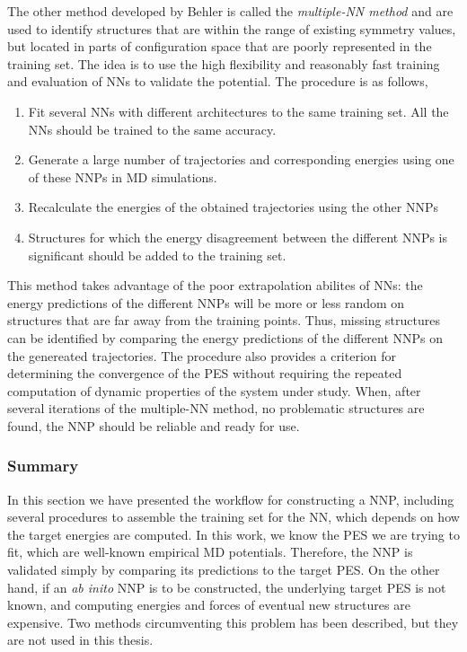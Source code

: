\documentclass[twoside,english]{uiofysmaster}
\begin{document}
The other method developed by Behler is called the \textit{multiple-NN method} and are used to identify 
structures that are within the range of existing symmetry values, but located
in parts of configuration space that are poorly represented in the training set.
The idea is to use the high flexibility and reasonably fast training and evaluation of NNs to validate 
the potential. The procedure is as follows,
\begin{enumerate}
 \item Fit several NNs with different architectures to the same training set. All the NNs should be trained
 to the same accuracy. 
 \item Generate a large number of trajectories and corresponding energies using one of these NNPs in MD simulations.
 \item Recalculate the energies of the obtained trajectories using the other NNPs
 \item Structures for which the energy disagreement between the different NNPs is significant should be added to 
 the training set.
\end{enumerate}
This method takes advantage of the poor extrapolation abilites of NNs: the energy predictions of the different NNPs will
be more or less random on structures that are far away from the training points. Thus, missing structures can 
be identified by comparing the energy predictions of the different NNPs on the genereated trajectories. The procedure 
also provides a criterion for determining the convergence of the PES without requiring the repeated computation 
of dynamic properties of the system under study. When, after several iterations of the multiple-NN method,
no problematic structures are found, the NNP should be reliable and ready for use. 

\subsubsection{Summary}
In this section we have presented the workflow for constructing a NNP, including several procedures to 
assemble the training set for the NN, which depends on how the target energies are computed. 
In this work, we know the PES we are trying to fit, which are well-known empirical MD potentials. 
Therefore, the NNP is validated simply by comparing its predictions to the target PES.  
On the other hand, if an \textit{ab inito} NNP is to be constructed, the underlying target PES is not known, 
and computing energies and forces of eventual new structures are expensive. Two methods circumventing
this problem has been described, but they are not used in this thesis. 
\end{document}
